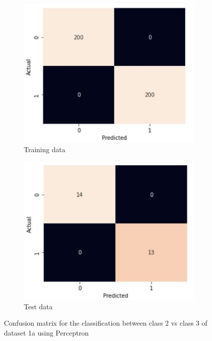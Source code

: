 \documentclass[11pt]{article}
\begin{document}
\begin{figure}
\centering
	\begin{subfigure}[b]{0.45\textwidth}
	\centering
	\includegraphics[scale=0.4]{dataset1a_perceptron_23_cm_train.jpg}
	\caption{Training data}
	\label{fig:fig1.1.6.1}
	\end{subfigure}
	\begin{subfigure}[b]{0.45\textwidth}
	\centering
	\includegraphics[scale=0.4]{dataset1a_perceptron_23_cm_test.jpg}
	\caption{Test data}
	\label{fig:fig1.1.6.2}
	\end{subfigure}
\caption{Confusion matrix for the classification between class 2 vs class 3 of dataset 1a using Perceptron}
\label{fig:fig1.1.6}
\end{figure}
\end{document}
